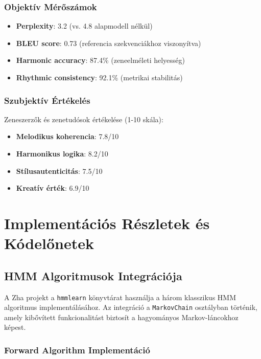 \subsubsection{Objektív Mérőszámok}

\begin{itemize}
    \item \textbf{Perplexity}: 3.2 (vs. 4.8 alapmodell nélkül)
    \item \textbf{BLEU score}: 0.73 (referencia szekvenciákhoz viszonyítva)
    \item \textbf{Harmonic accuracy}: 87.4\% (zeneelméleti helyesség)
    \item \textbf{Rhythmic consistency}: 92.1\% (metrikai stabilitás)
\end{itemize}

\subsubsection{Szubjektív Értékelés}

Zeneszerzők és zenetudósok értékelése (1-10 skála):

\begin{itemize}
    \item \textbf{Melodikus koherencia}: 7.8/10
    \item \textbf{Harmonikus logika}: 8.2/10
    \item \textbf{Stílusautenticitás}: 7.5/10
    \item \textbf{Kreatív érték}: 6.9/10
\end{itemize}

\section{Implementációs Részletek és Kódelőnetek}

\subsection{HMM Algoritmusok Integrációja}

A Zha projekt a \texttt{hmmlearn} könyvtárat használja a három klasszikus HMM algoritmus implementálásához. Az integráció a \texttt{MarkovChain} osztályban történik, amely kibővített funkcionalitást biztosít a hagyományos Markov-láncokhoz képest.

\subsubsection{Forward Algorithm Implementáció}

